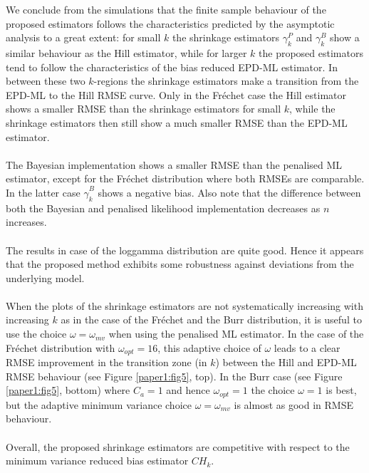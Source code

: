 \noindent We conclude from the simulations that the finite sample behaviour of the proposed estimators follows the characteristics predicted by the asymptotic analysis to a great extent: for small $k$ the shrinkage estimators
$\gamma_{k}^P$ and $\gamma_{k}^B$ show a similar behaviour as the Hill estimator, while for larger $k$ the proposed estimators tend to follow the characteristics of the bias reduced EPD-ML estimator. In between these two $k$-regions the shrinkage estimators make a transition from the EPD-ML to the Hill RMSE curve. Only in the Fréchet case the Hill estimator shows a smaller RMSE than the shrinkage estimators for small $k$, while the shrinkage estimators then still show a much smaller RMSE than the EPD-ML estimator. \\\\ The Bayesian implementation shows a smaller RMSE than the penalised ML estimator, except for the Fr\'echet distribution where both RMSEs are comparable. In the latter case $\hat{\gamma}^B_k$ shows a negative bias. Also note that the difference between both the Bayesian and penalised likelihood implementation decreases as $n$ increases. \\\\ 
The results in case of the loggamma distribution are quite good. Hence it appears that the proposed method exhibits some robustness against deviations from the underlying model.
\\\\
When the plots of the shrinkage estimators are not systematically increasing with increasing $k$ as in the case of the Fr\'echet and the Burr distribution, it is useful to use the choice $\omega=\omega_{mv}$ when using the penalised ML estimator. In the case of the Fr\'echet distribution with $\omega_{opt}=16$, this adaptive choice of $\omega$ leads to a clear RMSE improvement in the transition zone (in $k$) between the Hill and EPD-ML RMSE behaviour (see Figure \ref{paper1:fig5}, top). In the Burr case (see Figure \ref{paper1:fig5}, bottom) where $C_a=1$ and hence $\omega_{opt}=1$ the choice $\omega=1$ is best, but the adaptive minimum variance choice $\omega=\omega_{mv}$ is almost as good in RMSE behaviour. 
\\\\
Overall, the proposed shrinkage estimators are competitive with respect to the minimum variance reduced bias estimator $CH_k$.
